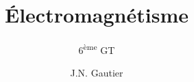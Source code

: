 

\subject{Physique(2h)}
\title{\Huge{Électromagnétisme}}
\subtitle{6\textsuperscript{ème} GT}
\author {J.N. Gautier}
\date{}



\tableofcontents





